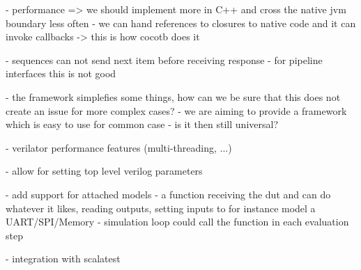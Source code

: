 - performance => we should implement more in C++ and cross the native jvm boundary less often
- we can hand references to closures to native code and it can invoke callbacks -> this is how cocotb does it

- sequences can not send next item before receiving response
- for pipeline interfaces this is not good

- the framework simplefies some things, how can we be sure that this does not create an issue for more complex cases?
- we are aiming to provide a framework which is easy to use for common case
- is it then still universal?


- verilator performance features (multi-threading, ...)

- allow for setting top level verilog parameters

- add support for attached models
- a function receiving the dut and can do whatever it likes, reading outputs, setting inputs to for instance model a
UART/SPI/Memory
- simulation loop could call the function in each evaluation step

- integration with scalatest
